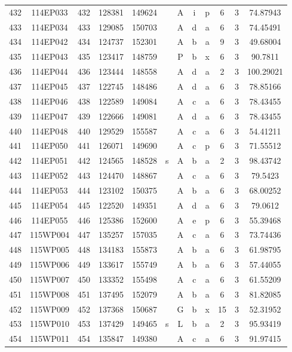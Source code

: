 \begin{tabular}{|*{12}{c|}}
432 & 114EP033 & 432 & 128381 & 149624 &  & A & i & p & 6 & 3 & 74.87943 \\ 
433 & 114EP034 & 433 & 129085 & 150703 &  & A & d & a & 6 & 3 & 74.45491 \\ 
434 & 114EP042 & 434 & 124737 & 152301 &  & A & b & a & 9 & 3 & 49.68004 \\ 
435 & 114EP043 & 435 & 123417 & 148759 &  & P & b & x & 6 & 3 & 90.7811 \\ 
436 & 114EP044 & 436 & 123444 & 148558 &  & A & d & a & 2 & 3 & 100.29021 \\ 
437 & 114EP045 & 437 & 122745 & 148486 &  & A & d & a & 6 & 3 & 78.85166 \\ 
438 & 114EP046 & 438 & 122589 & 149084 &  & A & c & a & 6 & 3 & 78.43455 \\ 
439 & 114EP047 & 439 & 122666 & 149081 &  & A & d & a & 6 & 3 & 78.43455 \\ 
440 & 114EP048 & 440 & 129529 & 155587 &  & A & c & a & 6 & 3 & 54.41211 \\ 
441 & 114EP050 & 441 & 126071 & 149690 &  & A & c & p & 6 & 3 & 71.55512 \\ 
442 & 114EP051 & 442 & 124565 & 148528 & s & A & b & a & 2 & 3 & 98.43742 \\ 
443 & 114EP052 & 443 & 124470 & 148867 &  & A & c & a & 6 & 3 & 79.5423 \\ 
444 & 114EP053 & 444 & 123102 & 150375 &  & A & b & a & 6 & 3 & 68.00252 \\ 
445 & 114EP054 & 445 & 122520 & 149351 &  & A & d & a & 6 & 3 & 79.0612 \\ 
446 & 114EP055 & 446 & 125386 & 152600 &  & A & e & p & 6 & 3 & 55.39468 \\ 
447 & 115WP004 & 447 & 135257 & 157035 &  & A & c & a & 6 & 3 & 73.74436 \\ 
448 & 115WP005 & 448 & 134183 & 155873 &  & A & b & a & 6 & 3 & 61.98795 \\ 
449 & 115WP006 & 449 & 133617 & 155749 &  & A & b & a & 6 & 3 & 57.44055 \\ 
450 & 115WP007 & 450 & 133352 & 155498 &  & A & c & a & 6 & 3 & 61.55209 \\ 
451 & 115WP008 & 451 & 137495 & 152079 &  & A & b & a & 6 & 3 & 81.82085 \\ 
452 & 115WP009 & 452 & 137368 & 150687 &  & G & b & x & 15 & 3 & 52.31952 \\ 
453 & 115WP010 & 453 & 137429 & 149465 & s & L & b & a & 2 & 3 & 95.93419 \\ 
454 & 115WP011 & 454 & 135847 & 149380 &  & A & c & a & 6 & 3 & 91.97415 \\ 

\end{tabular}
